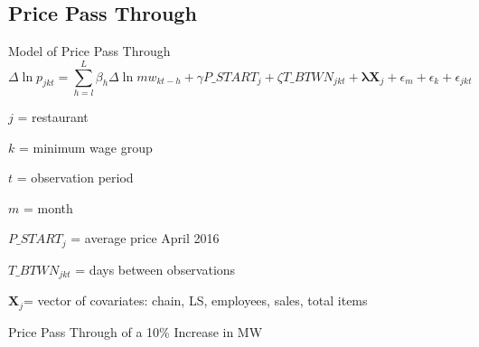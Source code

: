 \documentclass[xcolor=table]{beamer}
\newcommand\Wider[2][4em]{%
\makebox[\linewidth][c]{%
  \begin{minipage}{\dimexpr\textwidth+#1\relax}
  \raggedright#2
  \end{minipage}%
  }%
}
\begin{document}
\begin{spacing}{1.2}
\section{Price Pass Through}
%
%
%
%
%
%

%


\begin{frame} {Model of Price Pass Through}
\small
\begin{dmath}
\Delta \ln p_{jkt} = \sum_{h=l}^{L}\beta_h \Delta \ln mw_{kt-h} + \gamma P\_START_{j} + \zeta T\_BTWN_{jkt} + \boldsymbol{\lambda} \boldsymbol{X}_j + \epsilon_m + \epsilon_k + \epsilon_{jkt}
\end{dmath}


$j$ = restaurant

$k$ = minimum wage group

$t$ = observation period

$m$ = month

$P\_START_j$ = average price April 2016

$T\_BTWN_{jkt}$ = days between observations

$\boldsymbol{X}_j$= vector of covariates: chain, LS, employees, sales, total items

\end{frame}




\begin{frame}{Price Pass Through of a 10\% Increase in MW }
\centering
\Wider{
\tiny

}
\end{frame}

%
%


\end{spacing}
\end{document}
